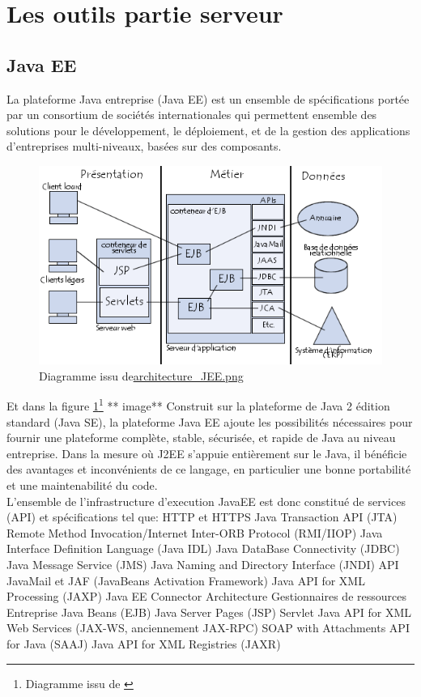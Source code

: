 \section{Les outils partie serveur}


\subsection{Java EE}

La plateforme Java entreprise (Java EE) est un ensemble de spécifications portée par un consortium de sociétés internationales qui permettent ensemble des solutions pour le développement, le déploiement, et de la gestion des applications d'entreprises multi-niveaux, basées sur des composants.

\begin{figure}[!h]
    \center
   	\includegraphics[scale=0.65]{architecture_JEE.png}
   	\caption{Diagramme issu de\url{architecture_JEE.png}}
    \label{reference1}
\end{figure}

Et dans la figure  \ref{reference1}\footnote{Diagramme issu de \url{}}
** image**
Construit sur la plateforme de Java 2 édition standard (Java SE), la plateforme Java EE ajoute les possibilités nécessaires pour fournir une plateforme complète, stable, sécurisée, et rapide de Java au niveau entreprise. 
Dans la mesure où J2EE s'appuie entièrement sur le Java, il bénéficie des avantages et inconvénients de ce langage, en particulier une bonne portabilité et une maintenabilité du code.\\
\newline
\indent
L'ensemble de l'infrastructure d'execution JavaEE est donc constitué de services (API) et spécifications tel que:
HTTP et HTTPS
Java Transaction API (JTA)
Remote Method Invocation/Internet Inter-ORB Protocol (RMI/IIOP)
Java Interface Definition Language (Java IDL)
Java DataBase Connectivity (JDBC)
Java Message Service (JMS)
Java Naming and Directory Interface (JNDI)
API JavaMail et JAF (JavaBeans Activation Framework)
Java API for XML Processing (JAXP)
Java EE Connector Architecture
Gestionnaires de ressources
Entreprise Java Beans (EJB)
Java Server Pages (JSP)
Servlet
Java API for XML Web Services (JAX-WS, anciennement JAX-RPC)
SOAP with Attachments API for Java (SAAJ)
Java API for XML Registries (JAXR)

